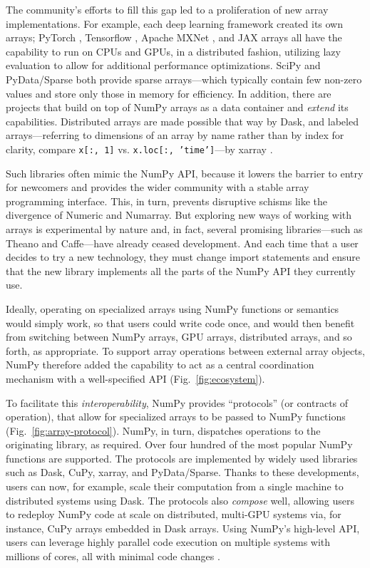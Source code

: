 The community's efforts to fill this gap led to a
proliferation of new array implementations. For example, each deep learning framework created
its own arrays; PyTorch \cite{NEURIPS2019_9015},
Tensorflow \cite{abadi2016tensorflow}, Apache MXNet \cite{chen2015mxnet},
and JAX arrays all have the
capability to run on CPUs and GPUs, in a distributed fashion, utilizing lazy evaluation
to allow for additional performance optimizations.  SciPy and PyData/Sparse both
provide sparse arrays---which typically contain few non-zero values and store
only those in memory for efficiency.
In addition, there are projects that build on top of NumPy arrays as a data
container and \textit{extend} its capabilities.  Distributed arrays are
made possible that way by Dask, and labeled arrays---referring to dimensions of
an array by name rather than by index for clarity, compare \texttt{x[:,~1]} vs.
\texttt{x.loc[:,~'time']}---by xarray \cite{hoyer2017xarray}.

Such libraries often mimic the NumPy API, because it lowers the
barrier to entry for newcomers and provides the wider community with a
stable array programming interface. This, in turn, prevents disruptive
schisms like the divergence of Numeric and Numarray.
But exploring new ways of working with arrays is experimental by nature
and, in fact, several promising libraries---such as Theano and Caffe---have
already ceased development. And each time that a user
decides to try a new technology, they must
change import statements and ensure that the new library implements
all the parts of the NumPy API they currently use.

Ideally, operating on specialized arrays using NumPy functions or semantics would
simply work, so that users could write code once, and would then benefit
from switching between NumPy arrays, GPU arrays, distributed arrays,
and so forth, as appropriate.
To support array operations between external array objects, NumPy
therefore added the capability to act as a central coordination
mechanism with a well-specified API (Fig.~\ref{fig:ecosystem}).

To facilitate this \emph{interoperability}, NumPy provides
``protocols'' (or contracts of operation), that allow for specialized arrays to be
passed to NumPy functions (Fig.~\ref{fig:array-protocol}).
NumPy, in turn, dispatches operations to the originating library, as required.
Over four hundred of the most popular
NumPy functions are supported.
The protocols are implemented by widely used libraries such as Dask, CuPy,
xarray, and PyData/Sparse.
Thanks to these developments, users can now, for example, scale
their computation from a single machine to distributed systems using Dask.
The protocols also \textit{compose} well, allowing users to redeploy NumPy
code at scale on distributed, multi-GPU systems via, for instance, CuPy arrays embedded in Dask
arrays. Using NumPy's high-level API, users can leverage highly parallel code
execution on multiple systems with millions of cores, all with minimal code
changes \cite{entschev2019}.

